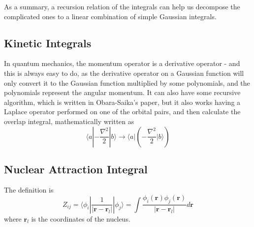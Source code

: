 \documentclass[12pt,a4paper,openany,twoside]{article}
\numberwithin{equation}{section}
\begin{document}
As a summary, a recursion relation of the integrals can help us decompose the complicated ones to a linear combination of simple Gaussian integrals.

\subsection{Kinetic Integrals}
In quantum mechanics, the momentum operator is a derivative operator - and this is always easy to do, as the derivative operator on a Gaussian function will only convert it to the Gaussian function multiplied by some polynomials, and the polynomials represent the angular momentum. It can also have some recursive algorithm, which is written in Obara-Saika's paper, but it also works having a Laplace operator performed on one of the orbital pairs, and then calculate the overlap integral, mathematically written as
\begin{equation}
    \langle a | - \frac{\nabla^2}{2} | b \rangle \rightarrow \langle a | (-\frac{\nabla^2}{2} | b \rangle)
\end{equation}

\subsection{Nuclear Attraction Integral}
The definition is
\begin{equation}
    Z_{ij} = \langle \phi_i | \frac{1}{|\boldsymbol{r} - \boldsymbol{r}_l|} |\phi_j \rangle = \int \frac{\phi_i(\boldsymbol{r}) \phi_j(\boldsymbol{r})}{|\boldsymbol{r} - \boldsymbol{r}_l|} d \boldsymbol{r} 
\end{equation}
where $\boldsymbol{r}_l$ is the coordinates of the nucleus.
\end{document}
